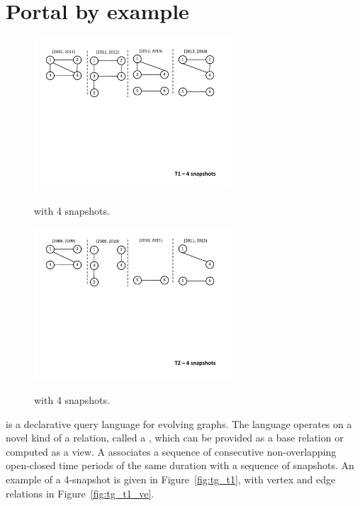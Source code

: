 \section{Portal by example}
\label{sec:language}

\begin{figure}[th!]
\centering
\begin{minipage}{3.2in}
  \includegraphics[width=2.9in]{figs/4snaps_T1.pdf}
  \caption{\tg {} with 4 snapshots.}{}
\vspace{-0.5cm}
  \label{fig:tg_t1}
\end{minipage}%
\begin{minipage}{3.2in}
  \includegraphics[width=2.9in]{figs/4snaps_T2.pdf}
  \caption{\tg {} with 4 snapshots.}{}
\vspace{-0.5cm}
  \label{fig:tg_t2}
\end{minipage}
\end{figure}

\ql is a declarative query language for evolving graphs.  The language
operates on a novel kind of a relation, called a \tg, which can be
provided as a base relation or computed as a view.  A \tg associates a
sequence of consecutive non-overlapping open-closed time periods of
the same duration with a sequence of snapshots.  An example of a
4-snapshot \tg is given in Figure~\ref{fig:tg_t1}, with vertex and
edge relations in Figure~\ref{fig:tg_t1_ve}.

